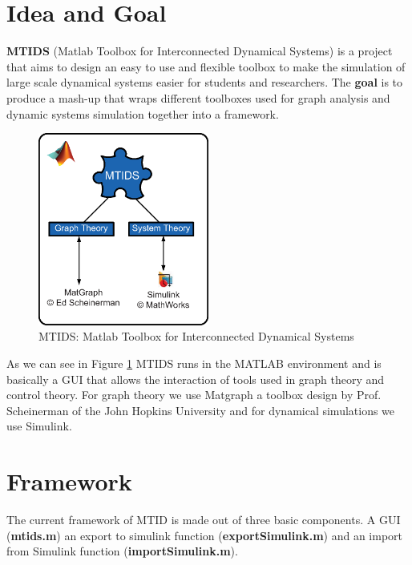 \documentclass[a4paper,twoside, openright,12pt]{report}
\begin{document}
\section{Idea and Goal}

\textbf{MTIDS} (Matlab Toolbox for Interconnected Dynamical Systems) is a project that aims to design an easy 
to use and flexible toolbox to make the simulation of large scale dynamical systems easier for students and researchers. 
The \textbf{goal} is to produce a mash-up that wraps different toolboxes used for graph analysis and 
dynamic systems simulation together into a framework.  


\begin{figure}[htb]
\centering
\includegraphics[width=0.5\textwidth]{pics/mtidsStructure.eps}
\caption[MTIDS idea]{MTIDS: Matlab Toolbox for Interconnected Dynamical Systems}
\label{mtidsFig}
\end{figure}

As we can see in Figure \ref{mtidsFig} MTIDS runs in the MATLAB environment and is basically a GUI that allows the interaction of tools used in graph theory 
and control theory.  For graph theory we use Matgraph a toolbox design by Prof. Scheinerman of the John Hopkins University \cite{MatgraphByExample} and for dynamical simulations
we use Simulink\cite{MatlabDocu}. 

\section{Framework}

The current framework of MTID is made out of three basic components. A GUI (\textbf{mtids.m}) an export to simulink function (\textbf{exportSimulink.m}) and
an import from Simulink function (\textbf{importSimulink.m}).\\
\end{document}
